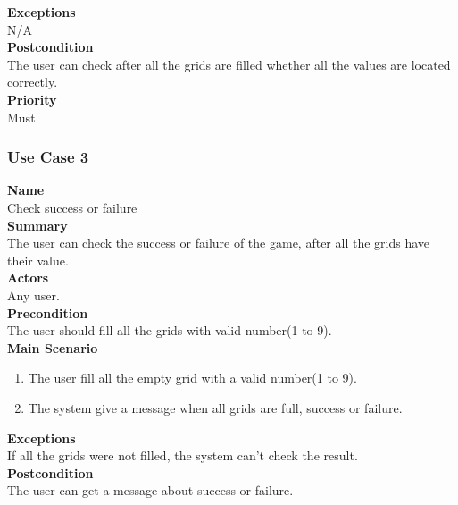 \documentclass[12pt]{article}
\begin{document}
\noindent
{\bf Exceptions}\\
N/A\\

\noindent
{\bf Postcondition}\\
The user can check after all the grids are filled whether all the values are located correctly.\\

\noindent
{\bf Priority}\\
Must \\

\noindent

\subsubsection{Use Case 3} \label{uc:3}

\noindent
{\bf Name}\\
Check success or failure\\

\noindent
{\bf Summary}\\
The user can check the success or failure of the game, after all the grids have their value.\\

\noindent
{\bf Actors}\\
Any user. \\

\noindent
{\bf Precondition}\\
The user should fill all the grids with valid number(1 to 9).\\

\noindent
{\bf Main Scenario}\\
\vspace*{-0.2in}
\begin{enumerate}
\item 
The user fill all the empty grid with a valid number(1 to 9).
\item
The system give a message when all grids are full, success or failure.
\end{enumerate}

\noindent
{\bf Exceptions}\\
If all the grids were not filled, the system can't check the result.\\

\noindent
{\bf Postcondition}\\
The user can get a message about success or failure. \\
\end{document}
